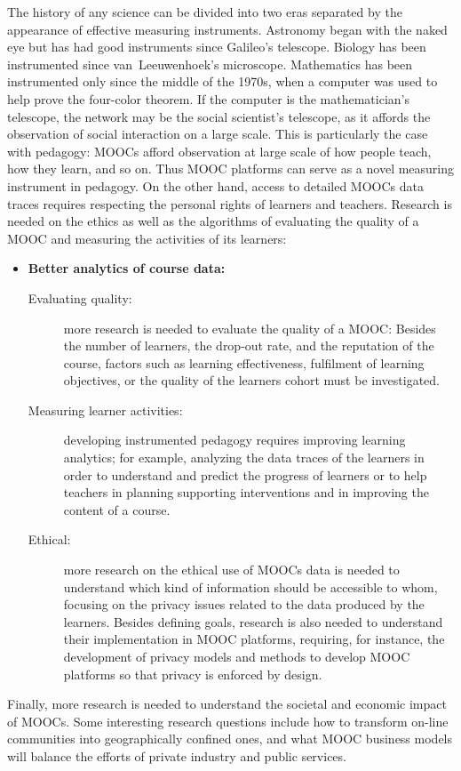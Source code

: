 The history of any science can be divided into two eras separated by the
appearance of effective measuring instruments.
Astronomy began with the naked eye but has had good instruments since
Galileo's telescope.
Biology has been instrumented since van~Leeuwenhoek's microscope.
Mathematics has been instrumented only since the middle of the 1970s,
when a computer was used to help prove the four-color theorem. If the
computer is the mathematician's telescope, the network may be the social
scientist's telescope, as it affords the observation of social
interaction on a large scale. This is particularly the case with
pedagogy: MOOCs afford observation at large scale of how people teach,
how they learn, and so on. Thus MOOC platforms can serve as a novel
measuring instrument in pedagogy. On the other hand, access to detailed
MOOCs data traces requires respecting the personal rights of learners
and teachers.
Research is needed on the ethics as well as the algorithms of
evaluating the quality of a MOOC and measuring the activities of its
learners:

\begin{itemize}
\item \textbf{Better analytics of course data:}
\begin{description}
\item[Evaluating quality:] more research is needed to evaluate the
  quality of a MOOC: Besides the number of learners, the drop-out rate, and the reputation of the course, factors such as learning effectiveness, fulfilment of learning objectives, or the  quality of the learners cohort must be investigated.
\item[Measuring learner activities:] developing instrumented pedagogy
  requires improving  learning analytics; for example, analyzing the data traces of the learners in order to understand and predict the  progress of learners or to help teachers in planning supporting interventions and in improving the content of a course.
\item[Ethical:] more research on the ethical use of MOOCs data is needed
  to understand which kind of information should be accessible to whom,
  focusing on the privacy issues related to the data produced by the
  learners. Besides defining goals, research is also needed to
  understand their implementation in MOOC platforms, requiring, for
  instance, the development of privacy models and methods to develop
  MOOC platforms so that privacy is enforced by design.
\end{description}
\end{itemize}

Finally, more research is needed to understand the societal and economic
impact of MOOCs. Some interesting research questions include how
to transform on-line communities into geographically confined
ones, and what MOOC business models will balance the efforts of private industry and
public services. 


